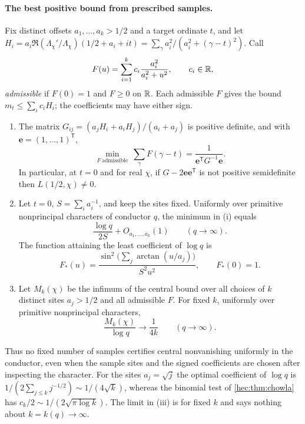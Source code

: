 \paragraph{The best positive bound from prescribed samples.}
Fix distinct offsets $a_1,\dots,a_k>1/2$ and a target ordinate $t$, and let
$H_i=a_i\Re(\Lambda_\chi'/\Lambda_\chi)(1/2+a_i+it)=\sum_\gamma a_i^2/(a_i^2+(\gamma-t)^2)$. Call
\[
 F(u)=\sum_{i=1}^kc_i\frac{a_i^2}{a_i^2+u^2},\qquad c_i\in\mathbb{R},
\]
\emph{admissible} if $F(0)=1$ and $F\ge0$ on $\mathbb{R}$. Each admissible $F$ gives the bound
$m_t\le\sum_ic_iH_i$; the coefficients may have either sign.

\begin{theorem}\label{hec:thm:kernels}
\begin{enumerate}[label=\textup{(\roman*)}]
\item The matrix $G_{ij}=(a_jH_i+a_iH_j)/(a_i+a_j)$ is positive definite, and with
$\mathbf e=(1,\dots,1)^{\mathsf T}$,
\[
 \min_{F\ \mathrm{admissible}}\ \sum_\gamma F(\gamma-t)=\frac1{\mathbf e^{\mathsf T}G^{-1}\mathbf e}.
\]
In particular, at $t=0$ and for real $\chi$, if $G-2\mathbf e\mathbf e^{\mathsf T}$ is not positive
semidefinite then $L(1/2,\chi)\ne0$.
\item Let $t=0$, $S=\sum_ia_i^{-1}$, and keep the sites fixed. Uniformly over primitive nonprincipal
characters of conductor $q$, the minimum in \textup{(i)} equals
\[
 \frac{\log q}{2S}+O_{a_1,\dots,a_k}(1)\qquad(q\to\infty).
\]
The function attaining the least coefficient of $\log q$ is
\[
 F_*(u)=\frac{\sin^2\bigl(\sum_j\arctan(u/a_j)\bigr)}{S^2u^2},\qquad F_*(0)=1 .
\]
\item Let $M_k(\chi)$ be the infimum of the central bound over all choices of $k$ distinct sites
$a_j>1/2$ and all admissible $F$. For fixed $k$, uniformly over primitive nonprincipal characters,
\[
 \frac{M_k(\chi)}{\log q}\longrightarrow\frac1{4k}\qquad(q\to\infty).
\]
\end{enumerate}
\end{theorem}

Thus no fixed number of samples certifies central nonvanishing uniformly in the conductor, even when the
sample sites and the signed coefficients are chosen after inspecting the character. For the sites
$a_j=\sqrt j$ the optimal coefficient of $\log q$ is $1/(2\sum_{j\le k}j^{-1/2})\sim1/(4\sqrt k)$, whereas
the binomial test of \cref{hec:thm:chowla} has $c_k/2\sim1/(2\sqrt{\pi\log k})$. The limit in (iii) is for
fixed $k$ and says nothing about $k=k(q)\to\infty$.

